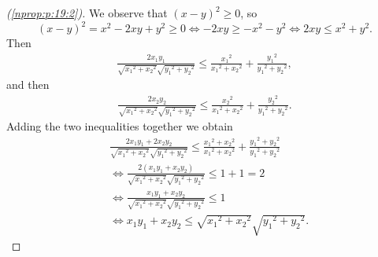 \begin{proof}[(\ref{nprop:p:19:2})]
	We observe that $(x - y)^2 \geq 0$, so
	$$
		(x - y)^2 = x^2 - 2 x y + y^2 \geq 0 \iff - 2 x y \geq -x^2 - y^2 \iff 2 x y \leq x^2 + y^2.
	$$
	Then
	\begin{align*}
		\frac{2 x_1 y_1}{\sqrt{x_1{ }^2 + x_2{ }^2} \sqrt{y_1{ }^2 + y_2{ }^2}} \leq \frac{x_1{ }^2}{x_1{ }^2 + x_2{ }^2} + \frac{y_1{ }^2}{y_1{ }^2 + y_2{ }^2},
	\end{align*}
	and then
	\begin{align*}
		\frac{2 x_2 y_2}{\sqrt{x_1{ }^2 + x_2{ }^2} \sqrt{y_1{ }^2 + y_2{ }^2}} \leq \frac{x_2{ }^2}{x_1{ }^2 + x_2{ }^2} + \frac{y_2{ }^2}{y_1{ }^2 + y_2{ }^2}.
	\end{align*}
	Adding the two inequalities together we obtain
	\begin{align*}
		 & \frac{2 x_1 y_1 + 2 x_2 y_2}{\sqrt{x_1{ }^2 + x_2{ }^2} \sqrt{y_1{ }^2 + y_2{ }^2}} \leq \frac{x_1{ }^2 + x_2{ }^2}{x_1{ }^2 + x_2{ }^2} + \frac{y_1{ }^2 + y_2{ }^2}{y_1{ }^2 + y_2{ }^2} \\
		 & \iff \frac{2 (x_1 y_1 + x_2 y_2)}{\sqrt{x_1{ }^2 + x_2{ }^2} \sqrt{y_1{ }^2 + y_2{ }^2}} \leq 1 + 1 = 2                                                                                    \\
		 & \iff \frac{x_1 y_1 + x_2 y_2}{\sqrt{x_1{ }^2 + x_2{ }^2} \sqrt{y_1{ }^2 + y_2{ }^2}} \leq 1                                                                                                \\
		 & \iff x_1 y_1 + x_2 y_2 \leq \sqrt{x_1{ }^2 + x_2{ }^2} \sqrt{y_1{ }^2 + y_2{ }^2}.
	\end{align*}
\end{proof}

